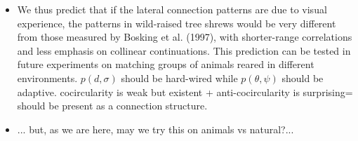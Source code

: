 \documentclass[10pt,handout,ignorenonframetext]{beamer}%
\begin{document}
{{\begin{itemize}
		\item \odot We thus predict that if the lateral connection patterns are due to visual experience, the patterns in wild-raised tree shrews would be very different from those measured by Bosking et al. (1997), with shorter-range correlations and less emphasis on collinear continuations. This prediction can be tested in future experiments on matching groups of animals reared in different environments. $p(d,\sigma)$ should be hard-wired while $p(\theta, \psi)$ should be adaptive. cocircularity is weak but existent + anti-cocircularity is surprising= should be present as a connection structure. %
		\item ... but, as we are here, may we try this on animals vs natural?...
	\end{itemize}
	} %
}
\end{document}
